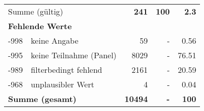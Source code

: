 \begin{longtable}{lXrrr}
     \midrule
     \multicolumn{2}{l}{Summe (gültig)} &
       \textbf{\num{241}} &
     \textbf{100} &
       \textbf{\num[round-mode=places,round-precision=2]{2,3}} \\
     \multicolumn{5}{l}{\textbf{Fehlende Werte}}\\
       -998 &
       keine Angabe &
         \num{59} &
        - &
         \num[round-mode=places,round-precision=2]{0,56} \\
       -995 &
       keine Teilnahme (Panel) &
         \num{8029} &
        - &
         \num[round-mode=places,round-precision=2]{76,51} \\
       -989 &
       filterbedingt fehlend &
         \num{2161} &
        - &
         \num[round-mode=places,round-precision=2]{20,59} \\
       -968 &
       unplausibler Wert &
         \num{4} &
        - &
         \num[round-mode=places,round-precision=2]{0,04} \\
     \midrule
     \multicolumn{2}{l}{\textbf{Summe (gesamt)}} &
          \textbf{\num{10494}} &
        \textbf{-} &
        \textbf{100} \\
     \bottomrule
     \end{longtable}
     
